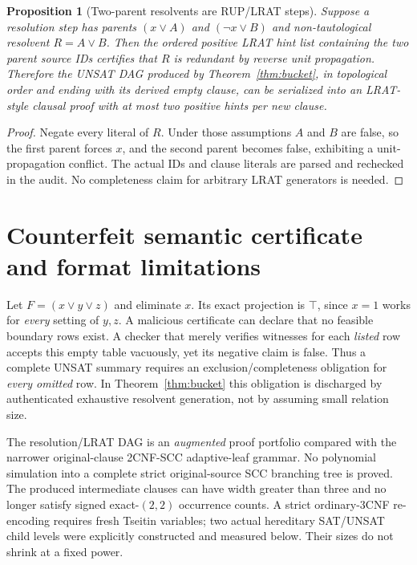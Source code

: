 \documentclass[11pt]{article}
\newtheorem{proposition}[theorem]{Proposition}
\begin{document}
\begin{proposition}[Two-parent resolvents are RUP/LRAT steps]\label{prop:lrat}
Suppose a resolution step has parents $(x\lor A)$ and $(\neg x\lor B)$ and non-tautological resolvent $R=A\lor B$. Then the ordered positive LRAT hint list containing the two parent source IDs certifies that $R$ is redundant by reverse unit propagation. Therefore the UNSAT DAG produced by Theorem~\ref{thm:bucket}, in topological order and ending with its derived empty clause, can be serialized into an LRAT-style clausal proof with at most two positive hints per new clause.
\end{proposition}
\begin{proof}
Negate every literal of $R$. Under those assumptions $A$ and $B$ are false, so the first parent forces $x$, and the second parent becomes false, exhibiting a unit-propagation conflict. The actual IDs and clause literals are parsed and rechecked in the audit. No completeness claim for arbitrary LRAT generators is needed.
\end{proof}

\section{Counterfeit semantic certificate and format limitations}\label{sec:counterfeit}
Let $F=(x\lor y\lor z)$ and eliminate $x$. Its exact projection is $\top$, since $x=1$ works for \emph{every} setting of $y,z$. A malicious certificate can declare that no feasible boundary rows exist. A checker that merely verifies witnesses for each \emph{listed} row accepts this empty table vacuously, yet its negative claim is false. Thus a complete UNSAT summary requires an exclusion/completeness obligation for \emph{every omitted} row. In Theorem~\ref{thm:bucket} this obligation is discharged by authenticated exhaustive resolvent generation, not by assuming small relation size.

The resolution/LRAT DAG is an \emph{augmented} proof portfolio compared with the narrower original-clause 2CNF-SCC adaptive-leaf grammar. No polynomial simulation into a complete strict original-source SCC branching tree is proved. The produced intermediate clauses can have width greater than three and no longer satisfy signed exact-$(2,2)$ occurrence counts. A strict ordinary-3CNF re-encoding requires fresh Tseitin variables; two actual hereditary SAT/UNSAT child levels were explicitly constructed and measured below. Their sizes do not shrink at a fixed power.
\end{document}
